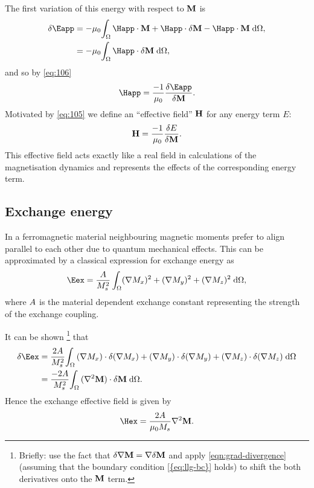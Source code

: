 The first variation of this energy with respect to $\boldsymbol{\mathrm{M}}$ is
\begin{equation}
  \begin{aligned}
    \label{eq:9}
    \variation \Eapp &= -\mu_0 \intd{ \Happ \cdot \Mv + \Happ \cdot \variation \Mv
      - \Happ \cdot \Mv}, \\
    &= -\mu_0 \intd{\Happ \cdot \variation \Mv},
  \end{aligned}
\end{equation}
and so by \cref{eq:106}
\begin{equation}
  \label{eq:105}
  \Happ = \frac{-1}{\mu_0} \vd{\Eapp}{\Mv}.
\end{equation}
Motivated by \cref{eq:105} we define an ``effective field'' $\boldsymbol{\mathrm{H}}$ for any energy term $E$:
\begin{equation}
  \boldsymbol{\mathrm{H}} = \frac{-1}{\mu_0} \frac{\delta E}{\delta \boldsymbol{\mathrm{M}}}.
  \label{eq:62}
\end{equation}
This effective field acts exactly like a real field in calculations of the magnetisation dynamics and represents the effects of the corresponding energy term.


\subsection{Exchange energy}

In a ferromagnetic material neighbouring magnetic moments prefer to align parallel to each other due to quantum mechanical effects.
This can be approximated by a classical expression for exchange energy \cite{Aharoni1996} as
\begin{equation}
  \label{eq:39}
  \Eex =  \frac{\Exchc}{M_s^2} \int_{\magd} (\nabla M_x)^2  + (\nabla M_y)^2  + (\nabla M_z)^2 \d \magd,
\end{equation}
where $A$ is the material dependent exchange constant representing the strength of the exchange coupling.

It can be shown \cite{Aharoni1996}\cite[46]{BrownMicromagnetics}\footnote{
  Briefly: use the fact that $\delta \nabla \boldsymbol{\mathrm{M}} = \nabla \delta \boldsymbol{\mathrm{M}}$ and apply \cref{eqn:grad-divergence} (assuming that the boundary condition \cref{{eq:llg-bc}} holds) to shift the both derivatives onto the $\boldsymbol{\mathrm{M}}$ term.
} that
\begin{equation}
  \begin{aligned}
    \variation \Eex &= \frac{2\Exchc}{M_s^2} \intd{
        (\nabla M_x) \cdot \variation (\nabla M_x)
      + (\nabla M_y) \cdot \variation (\nabla M_y)
      + (\nabla M_z) \cdot \variation (\nabla M_z)} \\
    &= \frac{-2 \Exchc}{M_s^2} \intd{(\lap \Mv) \cdot \variation \Mv}.
  \end{aligned}
\end{equation}
Hence the exchange effective field is given by
\begin{equation}
  \label{eq:Hex}
  \Hex = \frac{2 \Exchc}{ \mu_0 M_s} \lap \Mv.
\end{equation}


